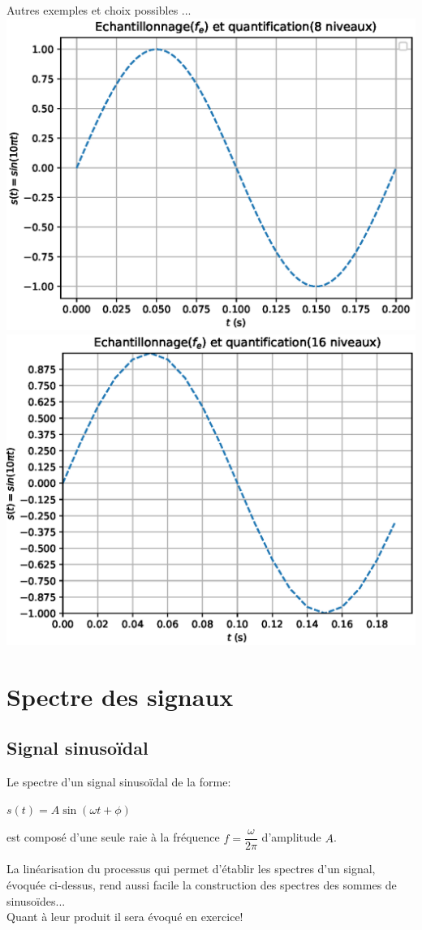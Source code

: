 \documentclass[11pt,a4paper]{article}
\newcounter{exem}
\newcounter{def}
\newcounter{prop}
\newcommand{\defprop}[2][]%
{ 
\addtocounter{prop}{1}
\begin{tcolorbox}[enhanced, arc=1ex,left=3pt,right=3pt,top=3pt,colbacktitle=white,colback=blue!10!white,coltitle=red!70!black, title =Propriété \theprop~#1\black, fonttitle=\sffamily\bfseries\large ]
#2
\end{tcolorbox}
}
\begin{document}
Autres exemples et choix possibles ...\\
\includegraphics[scale=1]{sin40x3bits.eps} \\
\includegraphics[scale=1]{sin50x4bits.eps} 
\newpage
\section{Spectre des signaux}
\subsection{Signal sinusoïdal}
\defprop{Le spectre d'un signal sinusoïdal de la forme:\\
 \begin{center}$s(t)=A\sin(\omega t + \phi)$ \end{center}
est composé d'une seule raie à la fréquence $f=\dfrac{\omega}{2\pi}$ d'amplitude $A$.}
La linéarisation du processus qui permet d'établir les spectres d'un signal, évoquée ci-dessus, rend aussi facile la construction des spectres des sommes de sinusoïdes...\\
Quant à leur produit il sera évoqué en exercice!
\end{document}
